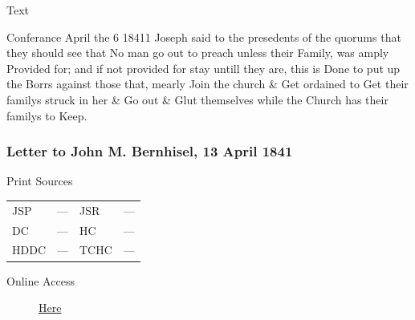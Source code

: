 				
				\begin{description}
					\item[Text]
				\end{description}
				
					Conferance April the 6 18411 Joseph said to the presedents of the quorums that they should see that No man go out to preach unless their Family, was amply Provided for; and if not provided for stay untill they are, this is Done to put up the Borrs against those that, mearly Join the church \& Get ordained to Get their familys struck in her \& Go out \& Glut themselves while the Church has their familys to Keep.
					
		\subsubsection{Letter to John M. Bernhisel, 13 April 1841}
			\label{EMS-1841-JS-13-APR-1841}
			
			\begin{description}
				\item[Print Sources]
			\end{description}

			\begin{tabular}{p{0.5in}p{1in}p{0.5in}p{1in}}
				JSP	 	& ---		& JSR 		& --- \\
				DC	 	& ---		& HC 		& --- \\
				HDDC 	& ---		& TCHC 		& --- \\
			\end{tabular}
			
			\begin{description}
				\item[Online Access] \href{https://www.josephsmithpapers.org/paper-summary/letter-to-johnm-bernhisel-13april-1841/1}{Here}
			\end{description}
			

